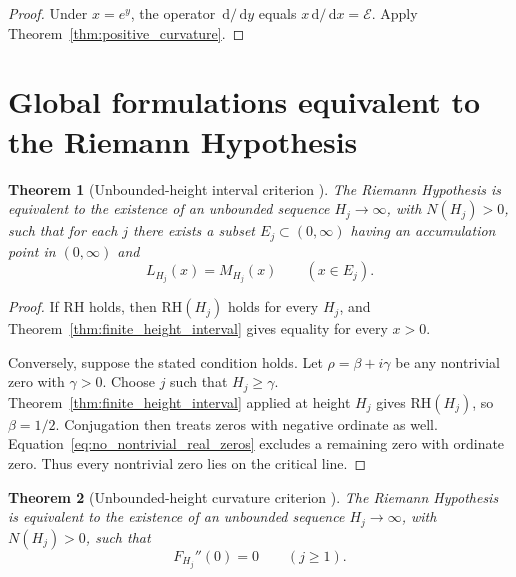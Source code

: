 \documentclass[11pt]{amsart}
\numberwithin{equation}{section}
\theoremstyle{plain}
\newtheorem{theorem}{Theorem}[section]
\theoremstyle{definition}
\theoremstyle{remark}
\newcommand{\RH}{\mathrm{RH}}
\newcommand{\dd}{\,\mathrm{d}}
\begin{document}
\begin{proof}
Under $x=e^y$, the operator $\dd/\dd y$ equals $x\dd/\dd x=\mathcal E$.  Apply Theorem~\ref{thm:positive_curvature}.
\end{proof}

\section{Global formulations equivalent to the Riemann Hypothesis}
\label{sec:global_equivalences}

\begin{theorem}[Unbounded-height interval criterion {}]
\label{thm:global_interval_criterion}
The Riemann Hypothesis is equivalent to the existence of an unbounded sequence $H_j\to\infty$, with $N(H_j)>0$, such that for each $j$ there exists a subset $E_j\subset(0,\infty)$ having an accumulation point in $(0,\infty)$ and
\begin{equation}
L_{H_j}(x)=M_{H_j}(x)
\qquad(x\in E_j).
\label{eq:global_interval_hypothesis}
\end{equation}
\end{theorem}

\begin{proof}
If $\RH$ holds, then $\RH(H_j)$ holds for every $H_j$, and Theorem~\ref{thm:finite_height_interval} gives equality for every $x>0$.

Conversely, suppose the stated condition holds.  Let $\rho=\beta+i\gamma$ be any nontrivial zero with $\gamma>0$.  Choose $j$ such that $H_j\geq\gamma$.  Theorem~\ref{thm:finite_height_interval} applied at height $H_j$ gives $\RH(H_j)$, so $\beta=1/2$.  Conjugation then treats zeros with negative ordinate as well.  Equation~\eqref{eq:no_nontrivial_real_zeros} excludes a remaining zero with ordinate zero.  Thus every nontrivial zero lies on the critical line.
\end{proof}

\begin{theorem}[Unbounded-height curvature criterion {}]
\label{thm:global_curvature_criterion}
The Riemann Hypothesis is equivalent to the existence of an unbounded sequence $H_j\to\infty$, with $N(H_j)>0$, such that
\begin{equation}
F_{H_j}''(0)=0
\qquad(j\geq1).
\label{eq:global_curvature_hypothesis}
\end{equation}
\end{theorem}
\end{document}
